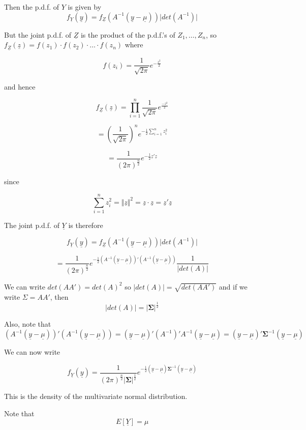 \documentclass[12pt,a4paper]{article}
\theoremstyle{regla}
\theoremstyle{remark}
\theoremstyle{definition}
\theoremstyle{nonumberbreak}
\begin{document}
Then the p.d.f. of $Y$ is given by $$f_{\underline{Y}}(\underline{y})= f_{\underline{Z}}(A^{-1}(\underline{y}- \underline{\mu})) \vert det(A^{-1}) \vert$$

But the joint p.d.f. of $\underline{Z}$ is the product of the p.d.f.'s of $Z_1, \ldots , Z_n$, so $f_{\underline{Z}}(\underline{z})= f(z_1) \cdot f(z_2) \cdot \ldots \cdot f(z_n)$ where

$$f(z_i) = \frac{1}{\sqrt{2 \pi}} e^{-\frac{z^2}{2}}$$

and hence

$$f_{\underline{Z}}(\underline{z}) = \prod_{i=1}^n \frac{1}{\sqrt{2 \pi}} e^{\frac{-z^2}{2}}$$

$$ = (\frac{1}{\sqrt{2 \pi}})^n e^{-\frac{1}{2} \sum_{i=1}^n z_i^2}$$

$$=\frac{1}{(2 \pi)^\frac{n}{2}} e^{-\frac{1}{2} \underline{z}'\underline{z}}$$

since

$$\sum_{i=1}^n z_i^2 = \Vert \underline{z} \Vert ^2 = \underline{z} \cdot \underline{z} = \underline{z}'  \underline{z}$$

The joint p.d.f. of $\underline{Y}$ is therefore 

$$f_{\underline{Y}}(\underline{y}) = f_{\underline{Z}}(A^{-1}(\underline{y} - \underline{\mu})) \vert det(A^{-1}) \vert $$

$$=\frac{1}{(2 \pi)^{\frac{n}{2}}} e^{-\frac{1}{2}(A^{-1}(\underline{y}-\underline{\mu}))'(A^{-1}(\underline{y}-\underline{\mu}))}\frac{1}{\vert det(A)\vert}$$

We can write $det(AA')=det(A)^2$ so $\vert det(A)\vert = \sqrt{det(AA')}$ and if we write $\Sigma=AA'$, then 
$$\vert det(A) \vert = \vert \boldsymbol{\Sigma} \vert ^\frac{1}{2}$$


Also, note that 
$$(A^{-1}(\underline{y}-\underline{\mu}))'(A^{-1}(\underline{y}-\underline{\mu})) = (\underline{y} - \underline{\mu})'(A^{-1})' A^{-1}(\underline{y} - \underline{\mu}) = (\underline{y} - \underline{\mu})' \boldsymbol{\Sigma}^{-1}(\underline{y}-\underline{\mu})$$

We can now write

$$f_{\underline{Y}}(\underline{y}) = \frac{1}{(2 \pi)^\frac{n}{2} \vert \boldsymbol{\Sigma} \vert ^{\frac{1}{2}}} e^{-\frac{1}{2} (\underline{y}-\underline{\mu}) \boldsymbol{\Sigma}^{-1} (\underline{y}-\underline{\mu})}$$

This is the density of the multivariate normal distribution.

Note that 
$$E[\underline{Y}] = \mu$$
\end{document}
